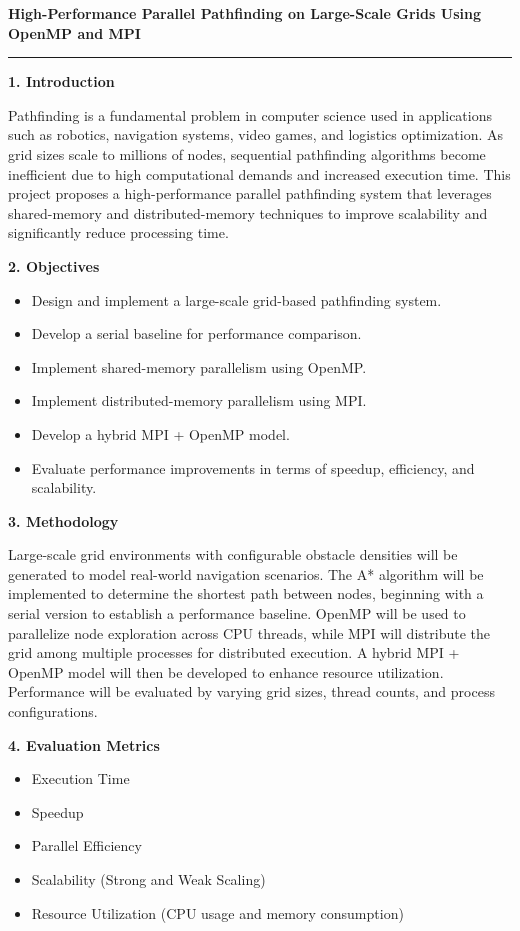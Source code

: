 \documentclass[11pt]{article}
\begin{document}
\noindent
{\Large \textbf{High-Performance Parallel Pathfinding on Large-Scale Grids Using OpenMP and MPI}}

\vspace{4pt}
\hrule
\vspace{10pt}

\textbf{1. Introduction}

Pathfinding is a fundamental problem in computer science used in applications such as robotics, navigation systems, video games, and logistics optimization. As grid sizes scale to millions of nodes, sequential pathfinding algorithms become inefficient due to high computational demands and increased execution time. This project proposes a high-performance parallel pathfinding system that leverages shared-memory and distributed-memory techniques to improve scalability and significantly reduce processing time.

\textbf{2. Objectives}

\begin{itemize}[noitemsep]
    \item Design and implement a large-scale grid-based pathfinding system.
    \item Develop a serial baseline for performance comparison.
    \item Implement shared-memory parallelism using OpenMP.
    \item Implement distributed-memory parallelism using MPI.
    \item Develop a hybrid MPI + OpenMP model.
    \item Evaluate performance improvements in terms of speedup, efficiency, and scalability.
\end{itemize}

\textbf{3. Methodology}

Large-scale grid environments with configurable obstacle densities will be generated to model real-world navigation scenarios. The A* algorithm will be implemented to determine the shortest path between nodes, beginning with a serial version to establish a performance baseline. OpenMP will be used to parallelize node exploration across CPU threads, while MPI will distribute the grid among multiple processes for distributed execution. A hybrid MPI + OpenMP model will then be developed to enhance resource utilization. Performance will be evaluated by varying grid sizes, thread counts, and process configurations.

\textbf{4. Evaluation Metrics}

\begin{itemize}[noitemsep]
    \item Execution Time
    \item Speedup
    \item Parallel Efficiency
    \item Scalability (Strong and Weak Scaling)
    \item Resource Utilization (CPU usage and memory consumption)
\end{itemize}
\end{document}
